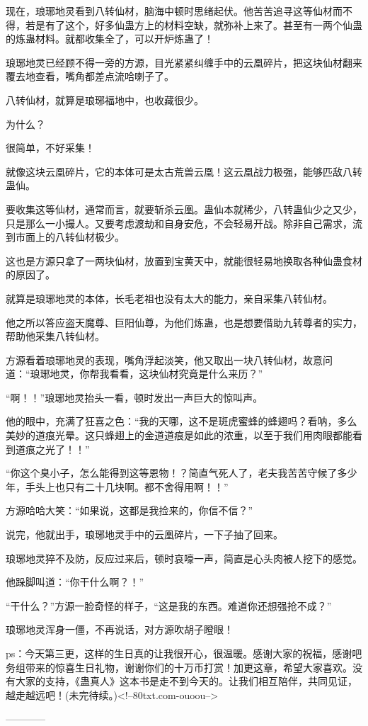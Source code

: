 \begin{this_body}
现在，琅琊地灵看到八转仙材，脑海中顿时思绪起伏。他苦苦追寻这等仙材而不得，若是有了这个，好多仙蛊方上的材料空缺，就弥补上来了。甚至有一两个仙蛊的炼蛊材料。就都收集全了，可以开炉炼蛊了！

琅琊地灵已经顾不得一旁的方源，目光紧紧纠缠手中的云凰碎片，把这块仙材翻来覆去地查看，嘴角都差点流哈喇子了。

八转仙材，就算是琅琊福地中，也收藏很少。

为什么？

很简单，不好采集！

就像这块云凰碎片，它的本体可是太古荒兽云凰！这云凰战力极强，能够匹敌八转蛊仙。

要收集这等仙材，通常而言，就要斩杀云凰。蛊仙本就稀少，八转蛊仙少之又少，只是那么一小撮人。又要考虑渡劫和自身安危，不会轻易开战。除非自己需求，流到市面上的八转仙材极少。

这也是方源只拿了一两块仙材，放置到宝黄天中，就能很轻易地换取各种仙蛊食材的原因了。

就算是琅琊地灵的本体，长毛老祖也没有太大的能力，亲自采集八转仙材。

他之所以答应盗天魔尊、巨阳仙尊，为他们炼蛊，也是想要借助九转尊者的实力，帮助他采集八转仙材。

方源看着琅琊地灵的表现，嘴角浮起淡笑，他又取出一块八转仙材，故意问道：“琅琊地灵，你帮我看看，这块仙材究竟是什么来历？”

“啊！！”琅琊地灵抬头一看，顿时发出一声巨大的惊叫声。

他的眼中，充满了狂喜之色：“我的天哪，这不是斑虎蜜蜂的蜂翅吗？看呐，多么美妙的道痕光晕。这只蜂翅上的金道道痕是如此的浓重，以至于我们用肉眼都能看到道痕之光了！！”

“你这个臭小子，怎么能得到这等恩物！？简直气死人了，老夫我苦苦守候了多少年，手头上也只有二十几块啊。都不舍得用啊！！”

方源哈哈大笑：“如果说，这都是我捡来的，你信不信？”

说完，他就出手，琅琊地灵手中的云凰碎片，一下子抽了回来。

琅琊地灵猝不及防，反应过来后，顿时哀嚎一声，简直是心头肉被人挖下的感觉。

他跺脚叫道：“你干什么啊？！”

“干什么？”方源一脸奇怪的样子，“这是我的东西。难道你还想强抢不成？”

琅琊地灵浑身一僵，不再说话，对方源吹胡子瞪眼！

ps：今天第三更，这样的生日真的让我很开心，很温暖。感谢大家的祝福，感谢吧务组带来的惊喜生日礼物，谢谢你们的十万币打赏！加更这章，希望大家喜欢。没有大家的支持，《蛊真人》这本书是走不到今天的。让我们相互陪伴，共同见证，越走越远吧！(未完待续。)<!--80txt.com-ouoou-->

------------

\end{this_body}

